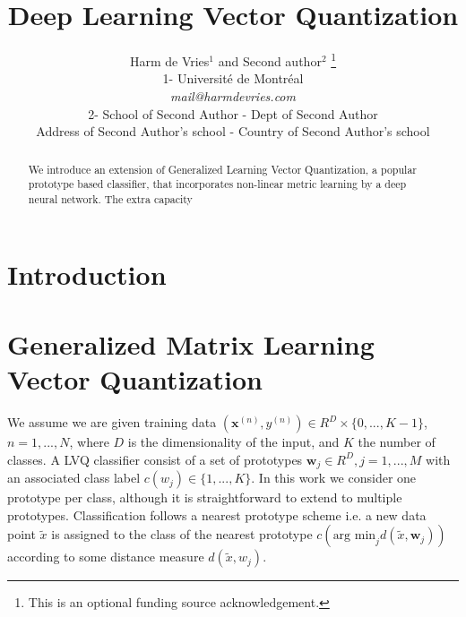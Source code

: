 \documentclass{esannV2}
\begin{document}
\title{Deep Learning Vector Quantization}

\author{Harm de Vries$^1$ and Second author$^2$
%
\thanks{This is an optional funding source acknowledgement.}
%
\vspace{.3cm}\\
%
1- Universit\'{e} de Montr\'{e}al \\
\textit{mail@harmdevries.com}
%
\vspace{.1cm}\\
2- School of Second Author - Dept of Second Author \\
Address of Second Author's school - Country of Second Author's school\\
}

\maketitle

\begin{abstract}
We introduce an extension of Generalized Learning Vector Quantization, a popular prototype based classifier, that incorporates non-linear metric learning by a deep neural network. The extra capacity 
\end{abstract}

\section{Introduction}

\section{Generalized Matrix Learning Vector Quantization}
We assume we are given training data $(\mathbf{x}^{(n)}, y^{(n)}) \in R^D \times \{0, ..., K-1\}$, $n=1, ..., N$, where $D$ is the dimensionality of the input, and $K$ the number of classes. A LVQ classifier consist of a set of prototypes ${\mathbf{w}_j} \in R^D, j=1, ..., M$ with an associated class label $c(w_j) \in \{1, ..., K\}$. In this work we consider one prototype per class, although it is straightforward to extend to multiple prototypes. Classification follows a nearest prototype scheme i.e. a new data point $\tilde{x}$ is assigned to the class of the nearest prototype $c(\mbox{arg min}_j d(\tilde{x}, \mathbf{w}_j))$ according to some distance measure $d(\tilde{x}, w_j)$. 
\end{document}
